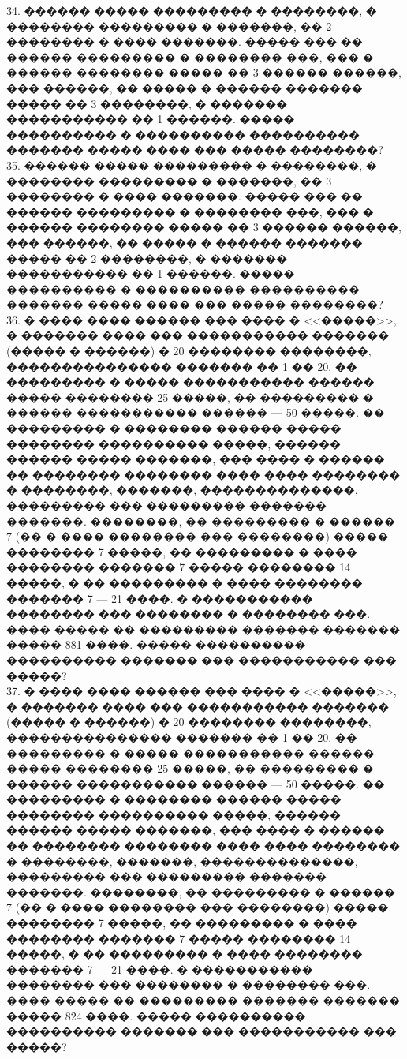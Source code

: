 \documentclass[12pt]{article}
\begin{document}
34. ������ ����� ��������� � ��������, � �������� ��������� � �������, �� 2 �������� � ���� �������. ����� ��� �� ������ ��������� � �������� ���, ��� � ������ �������� ����� �� 3 ������ ������, ��� ������, �� ����� � ������ ������� ����� �� 3 ��������, � ������� ����������� �� 1 ������. ����� ���������� � ���������� ���������� ������� ����� ���� ��� ����� ��������?\\
35. ������ ����� ��������� � ��������, � �������� ��������� � �������, �� 3 �������� � ���� �������. ����� ��� �� ������ ��������� � �������� ���, ��� � ������ �������� ����� �� 3 ������ ������, ��� ������, �� ����� � ������ ������� ����� �� 2 ��������, � ������� ����������� �� 1 ������. ����� ���������� � ���������� ���������� ������� ����� ���� ��� ����� ��������?\\
36. � ���� ���� ������ ��� ���� � <<�����>>, � ������� ���� ��� ����������� ������� (����� � ������) � 20 �������� ��������, ��������������� ������� �� 1 �� 20. �� ��������� � ����� ����������� ������ ����� �������� 25 �����, �� ��������� � ������ ����������� ������ --- 50 �����. �� ��������� � �������� ������ ����� �������� ���������� �����, ������ ������ ����� �������, ��� ���� � ������ �� �������� �������� ���� ���� �������� � ��������, �������, ��������������, ��������� ��� ��������� ������� �������. ��������, �� ��������� � ������ 7 (�� � ���� �������� ��� ��������) ����� �������� 7 �����, �� ��������� � ���� �������� ������� 7 ����� �������� 14 �����, � �� ��������� � ���� �������� ������� 7 --- 21 ����. � ����������� �������� ��� �������� � �������� ���. ���� ����� �� ��������� ������� ������� ����� 881 ����. ����� ���������� ���������� ������� ��� ����������� ��� �����?\\
37. � ���� ���� ������ ��� ���� � <<�����>>, � ������� ���� ��� ����������� ������� (����� � ������) � 20 �������� ��������, ��������������� ������� �� 1 �� 20. �� ��������� � ����� ����������� ������ ����� �������� 25 �����, �� ��������� � ������ ����������� ������ --- 50 �����. �� ��������� � �������� ������ ����� �������� ���������� �����, ������ ������ ����� �������, ��� ���� � ������ �� �������� �������� ���� ���� �������� � ��������, �������, ��������������, ��������� ��� ��������� ������� �������. ��������, �� ��������� � ������ 7 (�� � ���� �������� ��� ��������) ����� �������� 7 �����, �� ��������� � ���� �������� ������� 7 ����� �������� 14 �����, � �� ��������� � ���� �������� ������� 7 --- 21 ����. � ����������� �������� ��� �������� � �������� ���. ���� ����� �� ��������� ������� ������� ����� 824 ����. ����� ���������� ���������� ������� ��� ����������� ��� �����?\\
\end{document}
